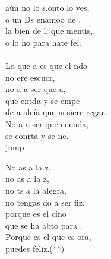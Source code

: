 \begin{cancion}%
	aún no lo s,onto lo ves, \\
	o un Ds enamoo de .\\
	la bien de l, que mentis, \\
	o lo ho para hate fel.\\
	\jump\\
	Lo que a es que el ndo\\
	no ere escucr,\\
	no a a ser que a,\\
	que entda y se empe\\
	de a aleía que nosiere regar.\\
	No a a ser que enenda,\\
	se conrta y se ne.\\jump\\
	\begin{chorus}%
	No as a la z,\\
	no as a la z,\\
	no ts a la alegra,\\
	no tengas do a ser fiz,\\
	porque  es el cino\\
	que se ha abto para .\\
	Porque  es el que es ora,\\
	puedes  feliz.(**)\\
	\end{chorus}%
	\jump\\
\end{cancion}%
